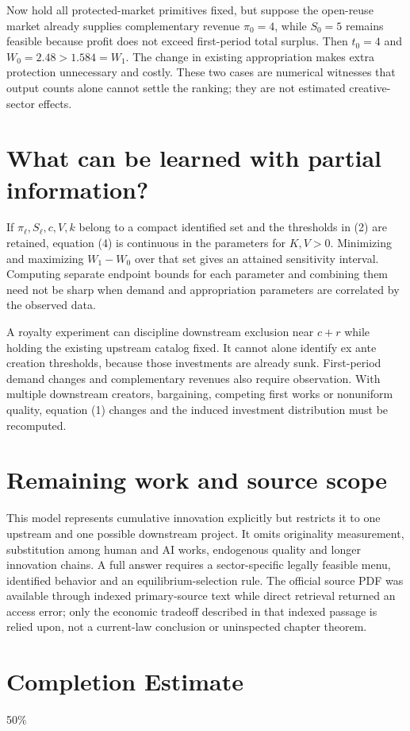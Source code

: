 \documentclass[11pt]{article}
\begin{document}
Now hold all protected-market primitives fixed, but suppose the open-reuse market already supplies complementary revenue $\pi_0=4$, while $S_0=5$ remains feasible because profit does not exceed first-period total surplus. Then $t_0=4$ and $W_0=2.48>1.584=W_1$. The change in existing appropriation makes extra protection unnecessary and costly. These two cases are numerical witnesses that output counts alone cannot settle the ranking; they are not estimated creative-sector effects.

\section*{What can be learned with partial information?}
If $\pi_\ell,S_\ell,c,V,k$ belong to a compact identified set and the thresholds in (2) are retained, equation (4) is continuous in the parameters for $K,V>0$. Minimizing and maximizing $W_1-W_0$ over that set gives an attained sensitivity interval. Computing separate endpoint bounds for each parameter and combining them need not be sharp when demand and appropriation parameters are correlated by the observed data.

A royalty experiment can discipline downstream exclusion near $c+r$ while holding the existing upstream catalog fixed. It cannot alone identify ex ante creation thresholds, because those investments are already sunk. First-period demand changes and complementary revenues also require observation. With multiple downstream creators, bargaining, competing first works or nonuniform quality, equation (1) changes and the induced investment distribution must be recomputed.

\section*{Remaining work and source scope}
This model represents cumulative innovation explicitly but restricts it to one upstream and one possible downstream project. It omits originality measurement, substitution among human and AI works, endogenous quality and longer innovation chains. A full answer requires a sector-specific legally feasible menu, identified behavior and an equilibrium-selection rule. The official source PDF was available through indexed primary-source text while direct retrieval returned an access error; only the economic tradeoff described in that indexed passage is relied upon, not a current-law conclusion or uninspected chapter theorem.

\section{Completion Estimate}
50\%
\end{document}
